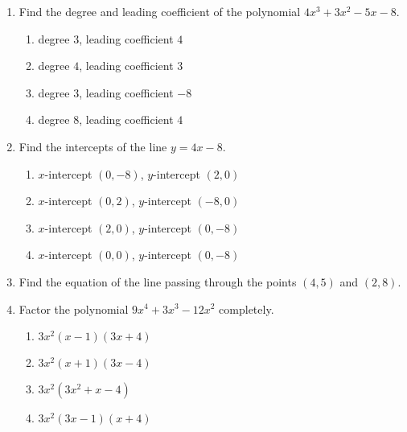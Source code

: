 \documentclass{article}
\begin{document}
\begin{enumerate}

  
 \item Find the degree and leading coefficient of the polynomial \(4x^3+3x^2-5x-8\).


  \begin{enumerate}
  \item degree \(3\), leading coefficient \(4\)  %
  \item degree \(4\), leading coefficient \(3\)
  \item degree \(3\), leading coefficient \(-8\)
  \item degree \(8\), leading coefficient \(4\)
  \end{enumerate}
  
\item Find the intercepts of the line \(y=4x-8\).
  \begin{enumerate}  
  \item \(x\text{-}\)intercept \((0,-8)\), \(y\text{-}\)intercept \((2,0)\) 
  \item \(x\text{-}\)intercept \((0,2)\), \(y\text{-}\)intercept \((-8,0)\)
  \item \(x\text{-}\)intercept \((2,0)\), \(y\text{-}\)intercept \((0,-8)\) %
  \item \(x\text{-}\)intercept \((0,0)\), \(y\text{-}\)intercept \((0,-8)\) 
  \end{enumerate}

\item Find the equation of the line passing through the points \((4,5)\) and \((2,8)\).

  \begin{enumerate}
  \end{enumerate}

  \item Factor the polynomial \(9x^4+3x^3-12x^2\) completely.

  \begin{enumerate}
  \item \(3x^2(x-1)(3x+4)\) %
  \item \(3x^2(x+1)(3x-4)\)
  \item \(3x^2(3x^2+x-4)\)
  \item \(3x^2(3x-1)(x+4)\)
  \end{enumerate}


\end{enumerate}
\end{document}
